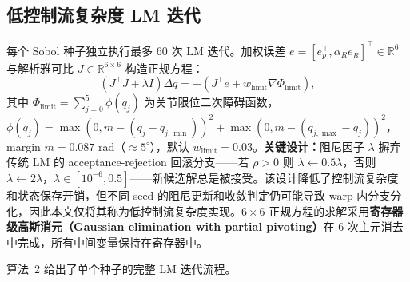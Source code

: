 \documentclass[twocolumn,a4paper,10pt]{ctexart}
\newcommand{\R}{\mathbb{R}}
\begin{document}
\subsection{低控制流复杂度 LM 迭代}

每个 Sobol 种子独立执行最多 60 次 LM 迭代\cite{levenberg1944,marquardt1963}。加权误差 $e=[e_p^\top,\alpha_R e_R^\top]^\top\in\R^6$ 与解析雅可比 $J\in\R^{6\times6}$ 构造正规方程：
\begin{equation}
(J^\top J+\lambda I)\Delta q=-(J^\top e+w_{\mathrm{limit}}\nabla\Phi_{\mathrm{limit}}),
\end{equation}
其中 $\Phi_{\mathrm{limit}}=\sum_{j=0}^5\phi(q_j)$ 为关节限位二次障碍函数，$\phi(q_j)=\max(0,m-(q_j-q_{j,\min}))^2+\max(0,m-(q_{j,\max}-q_j))^2$，margin $m=0.087$ rad（$\approx5^\circ$），默认 $w_{\mathrm{limit}}=0.03$。\textbf{关键设计：}阻尼因子 $\lambda$ 摒弃传统 LM 的 acceptance-rejection 回滚分支——若 $\rho>0$ 则 $\lambda\leftarrow0.5\lambda$，否则 $\lambda\leftarrow2\lambda$，$\lambda\in[10^{-6},0.5]$——新候选解总是被接受。该设计降低了控制流复杂度和状态保存开销，但不同 seed 的阻尼更新和收敛判定仍可能导致 warp 内分支分化，因此本文仅将其称为低控制流复杂度实现。$6\times6$ 正规方程的求解采用\textbf{寄存器级高斯消元（Gaussian elimination with partial pivoting）}在 6 次主元消去中完成，所有中间变量保持在寄存器中。

算法~2 给出了单个种子的完整 LM 迭代流程。
\end{document}
